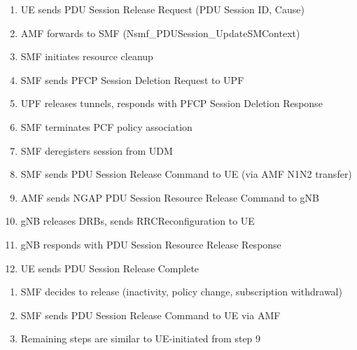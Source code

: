 

\CNchained{}

\begin{enumerate}
\def\labelenumi{\arabic{enumi}.}
\tightlist
\item
  UE sends PDU Session Release Request (PDU Session ID, Cause)
\item
  AMF forwards to SMF (Nsmf\_\allowbreak{}PDUSession\_\allowbreak{}UpdateSMContext)
\item
  SMF initiates resource cleanup
\item
  SMF sends PFCP Session Deletion Request to UPF
\item
  UPF releases tunnels, responds with PFCP Session Deletion Response
\item
  SMF terminates PCF policy association
\item
  SMF deregisters session from UDM
\item
  SMF sends PDU Session Release Command to UE (via AMF N1N2 transfer)
\item
  AMF sends NGAP PDU Session Resource Release Command to gNB
\item
  gNB releases DRBs, sends RRCReconfiguration to UE
\item
  gNB responds with PDU Session Resource Release Response
\item
  UE sends PDU Session Release Complete
\end{enumerate}


\begin{enumerate}
\def\labelenumi{\arabic{enumi}.}
\tightlist
\item
  SMF decides to release (inactivity, policy change, subscription withdrawal)
\item
  SMF sends PDU Session Release Command to UE via AMF
\item
  Remaining steps are similar to UE-initiated from step 9
\end{enumerate}






